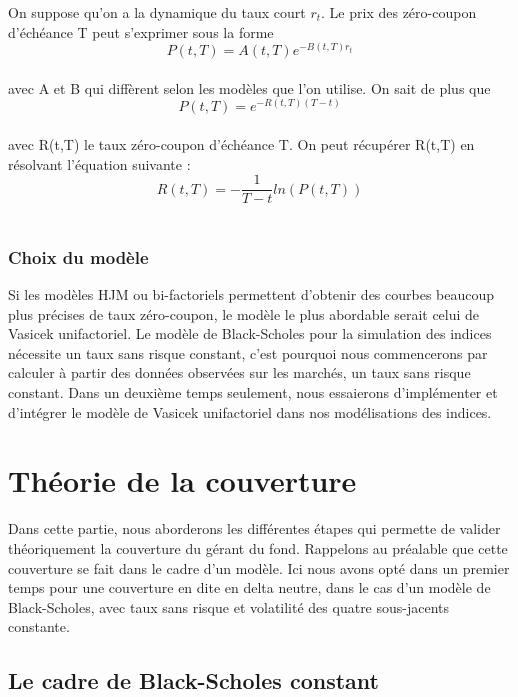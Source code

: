 \documentclass[french,12pt,a4paper]{article}
\begin{document}
On suppose qu'on a la dynamique du taux court $r_{t}$. Le prix des zéro-coupon d'échéance T peut s'exprimer sous la forme \\
$$ P(t,T)=A(t,T)e^{-B(t,T)r_{t}} $$ \\
avec A et B qui diffèrent selon les modèles que l'on utilise. On sait de plus que \\
$$ P(t,T)= e^{-R(t,T)(T-t)}  $$ \\
avec R(t,T) le taux zéro-coupon d'échéance T. On peut récupérer R(t,T) en résolvant l'équation suivante : \\
$$ R(t,T)=-\frac{1}{T-t}ln(P(t,T)) $$ \\

\subsubsection{Choix du modèle}
Si les modèles HJM ou bi-factoriels permettent d'obtenir des courbes beaucoup plus précises de taux zéro-coupon, le modèle le plus abordable serait celui de Vasicek unifactoriel. Le modèle de Black-Scholes pour la simulation des indices nécessite un taux sans risque constant, c'est pourquoi nous commencerons par calculer à partir des données observées sur les marchés, un taux sans risque constant. Dans un deuxième temps seulement, nous essaierons d'implémenter et d'intégrer le modèle de Vasicek unifactoriel dans nos modélisations des indices.

\newpage
\section{Théorie de la couverture}
Dans cette partie, nous aborderons les différentes étapes qui permette de valider théoriquement la couverture du gérant du fond. Rappelons au préalable que cette couverture se fait dans le cadre d'un modèle. Ici nous avons opté dans un premier temps pour une couverture en dite en delta neutre, dans le cas d'un modèle de Black-Scholes, avec taux sans risque et volatilité des quatre sous-jacents constante.

\subsection{Le cadre de Black-Scholes constant}
\end{document}
